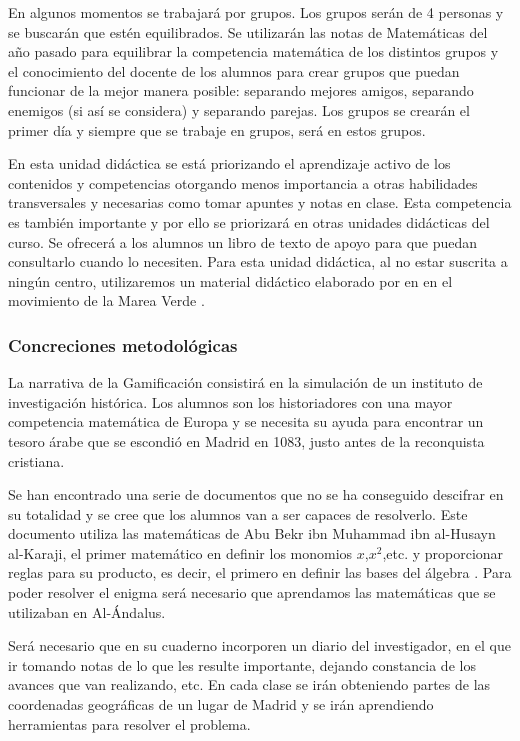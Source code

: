 En algunos momentos se trabajará por grupos.
%
Los grupos serán de 4 personas y se buscarán que estén equilibrados.
%
Se utilizarán las notas de Matemáticas del año pasado para equilibrar la competencia matemática de los distintos grupos y el conocimiento del docente de los alumnos para crear grupos que puedan funcionar de la mejor manera posible: separando mejores amigos, separando enemigos (si así se considera) y separando parejas.
%
\label{grupos}
%
Los grupos se crearán el primer día y siempre que se trabaje en grupos, será en estos grupos.

En esta unidad didáctica se está priorizando el aprendizaje activo de los contenidos y competencias otorgando menos importancia a otras habilidades transversales y necesarias como tomar apuntes y notas en clase. 
%
Esta competencia es también importante y por ello se priorizará en otras unidades didácticas del curso. 
%
Se ofrecerá a los alumnos un libro de texto de apoyo para que puedan consultarlo cuando lo necesiten.
%
Para esta unidad didáctica, al no estar suscrita a ningún centro, utilizaremos un material didáctico elaborado por \citeauthor{MareaVerde} en \citeyear{MareaVerde} en el movimiento de la Marea Verde \citep{MareaVerde}.


\subsubsection{Concreciones metodológicas}

La narrativa de la Gamificación consistirá en la simulación de un instituto de investigación histórica.
%
Los alumnos son los historiadores con una mayor competencia matemática de Europa y se necesita su ayuda para encontrar un tesoro árabe que se escondió en Madrid en 1083, justo antes de la reconquista cristiana.

Se han encontrado una serie de documentos que no se ha conseguido descifrar en su totalidad y se cree que los alumnos van a ser capaces de resolverlo.
%
Este documento utiliza las matemáticas de Abu Bekr ibn Muhammad ibn al-Husayn al-Karaji, el primer matemático en definir los monomios $x$,$x^2$,etc. y proporcionar reglas para su producto, es decir, el primero en definir las bases del álgebra \citep{MatArabe}.
%
Para poder resolver el enigma será necesario que aprendamos las matemáticas que se utilizaban en Al-Ándalus.

Será necesario que en su cuaderno incorporen un diario del investigador, en el que ir tomando notas de lo que les resulte importante, dejando constancia de los avances que van realizando, etc.
%
En cada clase se irán obteniendo partes de las coordenadas geográficas de un lugar de Madrid y se irán aprendiendo herramientas para resolver el problema.

